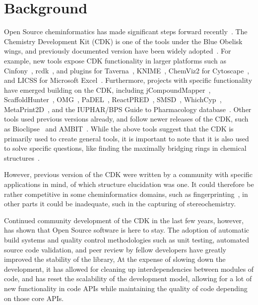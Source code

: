 \documentclass[10pt]{bmcart}
\begin{document}
\section*{Background}

Open Source cheminformatics has made significant steps forward recently~\cite{OBoyle2011}.
The Chemistry Development Kit (CDK) is one of the tools under the Blue Obelisk wings,
and previously documented version have been widely adopted~\cite{Steinbeck2003,Steinbeck2006}.
For example, new tools expose CDK functionality in larger platforms such as Cinfony~\cite{OBoyle2008},
rcdk~\cite{Guha2007}, and plugins for Taverna~\cite{Truszkowski2011},
KNIME~\cite{Beisken2013}, ChemViz2 for Cytoscape~\cite{ChemViz2}, and LICSS for
Microsoft Excel~\cite{Lawson2012}.
Furthermore, projects with specific functionality have emerged building on the CDK, including
jCompoundMapper~\cite{Hinselmann2011}, ScaffoldHunter~\cite{wetzel2009interactive}, OMG~\cite{Peironcely2012},
PaDEL~\cite{yap2011padel}, ReactPRED~\cite{ReactPRED}, SMSD~\cite{Rahman2009,Rahman2014,Rahman2016},
WhichCyp~\cite{Rostkowski2013}, MetaPrint2D~\cite{Carlsson2010}, and the IUPHAR/BPS Guide to Pharmacology database~\cite{Southan2016}.
Other tools used previous versions already, and follow
newer releases of the CDK, such as Bioclipse~\cite{spjuth2007bioclipse,
spjuth2009bioclipse} and AMBIT~\cite{jeliazkova2011ambit,jeliazkova2011ambitsmarts,kochev2013ambit}. While the above
tools suggest that the CDK is primarily used to create general tools, it is
important to note that it is also used to solve specific questions, like finding
the maximally bridging rings in chemical structures~\cite{Marth2015}.

However, previous version of the CDK were written by a community with specific applications
in mind, of which structure elucidation was one. It could therefore be rather competitive
in some cheminformatics domains, such as fingerprinting~\cite{Clark2014,Cannon2006}, in other parts
it could be inadequate, such in the capturing of stereochemistry.

Continued community development of the CDK in the last few years, however, has shown that
Open Source software is here to stay. The adoption of automatic build systems and
quality control methodologies such as unit testing, automated source code validation,
and peer review by fellow developers have greatly improved the stability of the library,
At the expense of slowing down the development, it has allowed for cleaning up interdependencies
between modules of code, and has reset the scalability of the development model,
allowing for a lot of new functionality in code APIs while maintaining the quality
of code depending on those core APIs.
\end{document}
